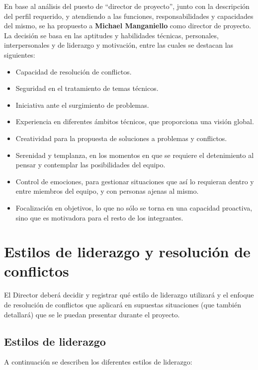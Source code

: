 En base al análisis del puesto de ``director de proyecto'', junto con la descripción del perfil requerido, y atendiendo a las funciones, responsabilidades y capacidades del mismo, se ha propuesto a \textbf{Michael Manganiello} como director de proyecto.
La decisión se basa en las aptitudes y habilidades técnicas, personales, interpersonales y de liderazgo y motivación, entre las cuales se destacan las siguientes:

\begin{itemize}
    \item Capacidad de resolución de conflictos.
    \item Seguridad en el tratamiento de temas técnicos.
    \item Iniciativa ante el surgimiento de problemas.
    \item Experiencia en diferentes ámbitos técnicos, que proporciona una visión global.
    \item Creatividad para la propuesta de soluciones a problemas y conflictos.
    \item Serenidad y templanza, en los momentos en que se requiere el detenimiento al pensar y contemplar las posibilidades del equipo.
    \item Control de emociones, para gestionar situaciones que así lo requieran dentro y entre miembros del equipo, y con personas ajenas al mismo.
    \item Focalización en objetivos, lo que no sólo se torna en una capacidad proactiva, sino que es motivadora para el resto de los integrantes.
\end{itemize}

\newpage

\section{Estilos de liderazgo y resolución de conflictos}
El Director deberá decidir y registrar qué estilo de liderazgo utilizará y el enfoque de resolución de conflictos que aplicará en supuestas situaciones (que también detallará) que se le puedan presentar durante el proyecto.

\subsection{Estilos de liderazgo}

A continuación se describen los diferentes estilos de liderazgo:

